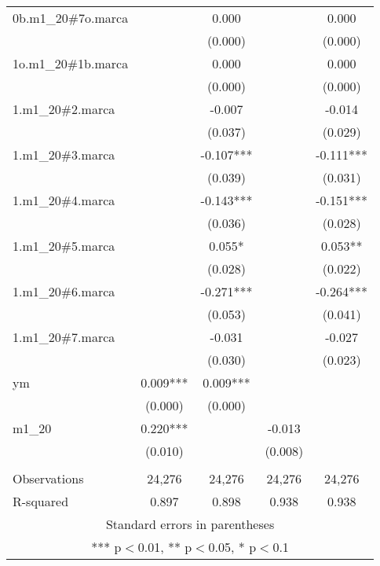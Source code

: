 \begin{tabular}{lcccc}
0b.m1\_20\#7o.marca &  & 0.000 &  & 0.000 \\
 &  & (0.000) &  & (0.000) \\
1o.m1\_20\#1b.marca &  & 0.000 &  & 0.000 \\
 &  & (0.000) &  & (0.000) \\
1.m1\_20\#2.marca &  & -0.007 &  & -0.014 \\
 &  & (0.037) &  & (0.029) \\
1.m1\_20\#3.marca &  & -0.107*** &  & -0.111*** \\
 &  & (0.039) &  & (0.031) \\
1.m1\_20\#4.marca &  & -0.143*** &  & -0.151*** \\
 &  & (0.036) &  & (0.028) \\
1.m1\_20\#5.marca &  & 0.055* &  & 0.053** \\
 &  & (0.028) &  & (0.022) \\
1.m1\_20\#6.marca &  & -0.271*** &  & -0.264*** \\
 &  & (0.053) &  & (0.041) \\
1.m1\_20\#7.marca &  & -0.031 &  & -0.027 \\
 &  & (0.030) &  & (0.023) \\
ym & 0.009*** & 0.009*** &  &  \\
 & (0.000) & (0.000) &  &  \\
m1\_20 & 0.220*** &  & -0.013 &  \\
 & (0.010) &  & (0.008) &  \\
 &  &  &  &  \\
Observations & 24,276 & 24,276 & 24,276 & 24,276 \\
 R-squared & 0.897 & 0.898 & 0.938 & 0.938 \\ \hline
\multicolumn{5}{c}{ Standard errors in parentheses} \\
\multicolumn{5}{c}{ *** p$<$0.01, ** p$<$0.05, * p$<$0.1} \\
\end{tabular}
